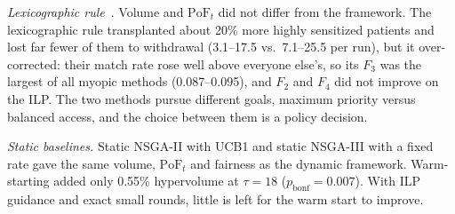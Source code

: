 \documentclass[journal]{IEEEtran}
\newcommand{\pof}{\ensuremath{\mathrm{PoF}_t}}
\begin{document}
\emph{Lexicographic rule}~\cite{dickerson2014price}. Volume and
$\pof$ did not differ from the framework. The lexicographic rule
transplanted about 20\% more highly sensitized patients and lost far
fewer of them to withdrawal (3.1--17.5 vs.\ 7.1--25.5 per run), but it
over-corrected: their match rate rose well above everyone else's, so
its $F_3$ was the largest of all myopic methods (0.087--0.095), and
$F_2$ and $F_4$ did not improve on the ILP. The two methods pursue
different goals, maximum priority versus balanced access, and the
choice between them is a policy decision.

\emph{Static baselines.} Static NSGA-II with UCB1 and static NSGA-III
with a fixed rate gave the same volume, $\pof$ and fairness as the
dynamic framework. Warm-starting added only 0.55\% hypervolume at
$\tau = 18$ ($p_{\mathrm{bonf}} = 0.007$). With ILP guidance and exact
small rounds, little is left for the warm start to improve.
\end{document}
